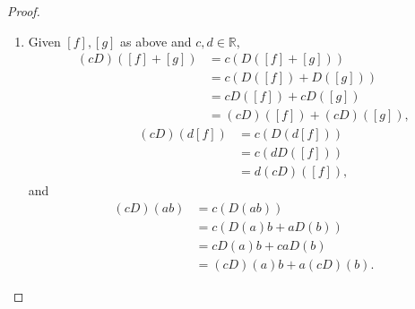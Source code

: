 \documentclass{article}
\theoremstyle{definition}
\begin{document}
\begin{proof}
\begin{enumerate}[label=(\alph*)]
\begin{align*}
			                             & = g(p)(D + D^\prime)([f]) + f(p)(D + D^\prime)([g]),
		      \end{align*}
		      so $D + D^\prime$ follows the Leibniz rule, and thus is a derivation at $p$.
		\item Given $[f], [g]$ as above and $c, d \in \mathbb{R}$, \begin{align*}
			      (cD)([f] + [g]) & = c(D([f] + [g]))        \\
			                      & = c(D([f]) + D([g]))     \\
			                      & = cD([f]) + cD([g])      \\
			                      & = (cD)([f]) + (cD)([g]),
		      \end{align*}
		      \begin{align*}
			      (cD)(d[f]) & = c(D(d[f]))  \\
			                 & = c(dD([f]))  \\
			                 & = d(cD)([f]),
		      \end{align*}
		      and \begin{align*}
			      (cD)(ab) & = c(D(ab))            \\
			               & = c(D(a)b + aD(b))    \\
			               & = cD(a)b + caD(b)     \\
			               & = (cD)(a)b + a(cD)(b).
		      \end{align*}
	\end{enumerate}
\end{proof}
\end{document}
